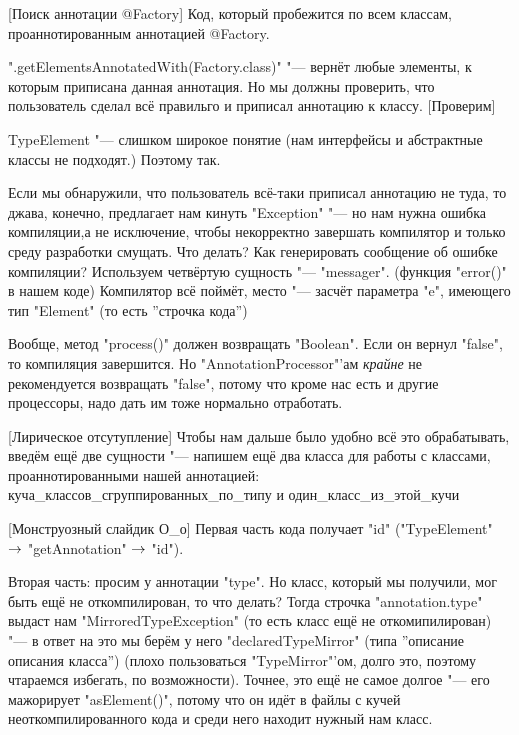 [Поиск аннотации @Factory]
Код, который пробежится по всем классам, проаннотированным аннотацией @Factory.

\java".getElementsAnnotatedWith(Factory.class)" "--- вернёт любые элементы, к которым приписана данная аннотация.
Но мы должны проверить, что пользователь %
сделал всё правильго и приписал аннотацию к классу.
[Проверим]

TypeElement "--- слишком широкое понятие (нам интерфейсы и абстрактные классы не подходят.)
Поэтому так.

Если мы обнаружили, что пользователь всё-таки приписал аннотацию не туда,
то джава, конечно, предлагает нам кинуть \java"Exception" "--- но нам нужна ошибка компиляции,а не исключение, чтобы некорректно завершать компилятор и только среду разработки смущать.
Что делать? Как генерировать сообщение об ошибке компиляции?
Используем четвёртую сущность "--- \java"messager".
(функция \java"error()" в нашем коде)
Компилятор всё поймёт, место "--- засчёт параметра \java"e", имеющего тип \java"Element" (то есть ''строчка кода'')

Вообще, метод \java"process()" должен возвращать \java"Boolean". 
Если он вернул \java"false", то компиляция завершится.
Но \java"AnnotationProcessor"'ам \textit{крайне} не рекомендуется возвращать \java"false", потому что кроме нас есть и другие процессоры, надо дать им тоже нормально отработать.

[Лирическое отсутупление]
Чтобы нам дальше было удобно всё это обрабатывать, введём ещё две сущности "--- напишем ещё два класса для работы с классами, проаннотированными нашей аннотацией: куча\_классов\_сгруппированных\_по\_типу и один\_класс\_из\_этой\_кучи

[Монструозный слайдик О\_о]
Первая часть кода получает \java"id" (\java"TypeElement" $\rightarrow$ \java"getAnnotation" $\rightarrow$ \java"id").

Вторая часть: просим у аннотации \java"type". 
Но класс, который мы получили, мог быть ещё не откомпилирован, то что делать?
Тогда строчка \java"annotation.type" выдаст нам \java"MirroredTypeException" (то есть класс ещё не откомипилирован) "--- в ответ на это мы берём у него \java"declaredTypeMirror" (типа ''описание описания класса'')
(плохо пользоваться \java"TypeMirror"'ом, долго это, поэтому чтараемся избегать, по возможности). 
Точнее, это ещё не самое долгое "--- его мажорирует \java"asElement()", потому что он идёт в файлы с кучей неоткомпилированного кода и среди него находит нужный нам класс.

